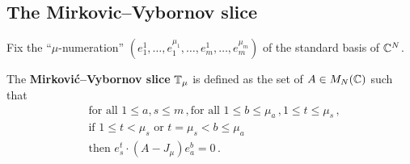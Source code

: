 \documentclass[draft]{article}
\begin{document}


    
\subsection{The Mirkovic--Vybornov slice} 
% 
Fix the ``$\mu$-numeration'' \((e^1_1,\ldots,e^{\mu_1}_1,\ldots,e^1_m,\ldots,e^{\mu_m}_m)\) of the standard basis of $\mathbb C^N$. 
\begin{definition}The \textbf{Mirkovi\'c--Vybornov slice} $\mathbb T_\mu$ is defined as the set of $A\in M_N(\mathbb C)$ such that 
    \[
        \begin{aligned}
            &\text{for all } 1 \le a,s\le m\,,
            \text{for all } 1\le b\le \mu_a\,, 1\le t\le \mu_s\,, \\
            &\text{if } 1\le t < \mu_s \text{ or } t = \mu_s < b \le \mu_a \\
            &\text{then } e^t_s\cdot (A-J_\mu) e^b_a = 0 \,.
        \end{aligned}    
    \]
\end{definition}

\end{document}
